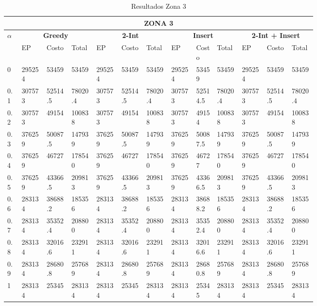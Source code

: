 \documentclass[conference]{IEEEtran}
\begin{document}
\begin{table*}[t]
\caption{Resultados Zona 3}
\centering
\begin{tabular}{|p{0.03\linewidth}|p{0.06\linewidth}|p{0.06\linewidth}|p{0.06\linewidth}|p{0.06\linewidth}|p{0.06\linewidth}|p{0.06\linewidth}|p{0.06\linewidth}|p{0.05\linewidth}|p{0.06\linewidth}|p{0.06\linewidth}|p{0.06\linewidth}|p{0.06\linewidth}|}
\hline
\multicolumn{13}{|c|}{\textbf{ZONA 3}} \\ 
\hline

\multirow{2}{*}{\textbf{$\alpha$}}  & \multicolumn{3}{|c|}{\textbf{Greedy}} & \multicolumn{3}{|c|}{\textbf{2-Int}} & \multicolumn{3}{|c|}{\textbf{Insert}} & \multicolumn{3}{|c|}{\textbf{2-Int + Insert}} \\

\cline{2-13}
 & EP & Costo & Total & EP & Costo & Total & EP & Costo & Total & EP & Costo & Total  \\
\hline
0 & 295254 & 53459 & 53459 & 295254 & 53459 & 53459 & 295254 & 53459 & 53459 & 295254 & 53459 & 53459  \\
\hline

0.1 & 307573 & 52514.5 & 78020.4 & 307573 & 52514.5 & 78020.4 & 307573 & 52514.5 & 78020.4 & 307573 & 52514.5 & 78020.4  \\
\hline

0.2 & 307573 & 49154 & 100838 & 307573 & 49154 & 100838 & 307573 & 49154 & 100838 & 307573 & 49154 & 100838  \\
\hline

0.3 & 376259 & 50087.5 & 147939 & 376259 & 50087.5 & 147939 & 376259 & 50087.5 & 147939 & 376259 & 50087.5 & 147939  \\
\hline

0.4 & 376259 & 46727 & 178540 & 376259 & 46727 & 178540 & 376259 & 46727 & 178540 & 376259 & 46727 & 178540  \\
\hline

0.5 & 376259 & 43366.5 & 209813 & 376259 & 43366.5 & 209813 & 376259 & 43366.5 & 209813 & 376259 & 43366.5 & 209813  \\
\hline

0.6 & 283134 & 38688.2 & 185356 & 283134 & 38688.2 & 185356 & 283134 & 38688.2 & 185356 & 283134 & 38688.2 & 185356  \\
\hline

0.7 & 283134 & 35352.4 & 208800 & 283134 & 35352.4 & 208800 & 283134 & 35352.4 & 208800 & 283134 & 35352.4 & 208800  \\
\hline

0.8 & 283134 & 32016.6 & 232911 & 283134 & 32016.6 & 232911 & 283134 & 32016.6 & 232911 & 283134 & 32016.6 & 232911  \\
\hline

0.9 & 283134 & 28680.8 & 257689 & 283134 & 28680.8 & 257689 & 283134 & 28680.8 & 257689 & 283134 & 28680.8 & 257689  \\
\hline

1 & 283134 & 25345 & 283134 & 283134 & 25345 & 283134 & 283134 & 25345 & 283134 & 283134 & 25345 & 283134  \\
\hline
\end{tabular}
\end{table*}
\end{document}
